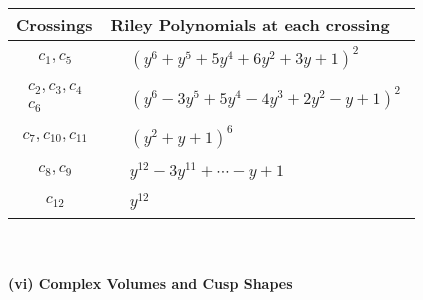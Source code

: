 \documentclass[1p]{elsarticle_modified}
\theoremstyle{definition}
\begin{document}
\begin{tabular}{m{50pt}|m{274pt}}
Crossings & \hspace{64pt}Riley Polynomials at each crossing \\
\hline $$\begin{aligned}c_{1},c_{5}\end{aligned}$$&$\begin{aligned}
&(y^6+y^5+5 y^4+6 y^2+3 y+1)^2
\end{aligned}$\\
\hline $$\begin{aligned}c_{2},c_{3},c_{4}\\c_{6}\end{aligned}$$&$\begin{aligned}
&(y^6-3 y^5+5 y^4-4 y^3+2 y^2- y+1)^2
\end{aligned}$\\
\hline $$\begin{aligned}c_{7},c_{10},c_{11}\end{aligned}$$&$\begin{aligned}
&(y^2+y+1)^6
\end{aligned}$\\
\hline $$\begin{aligned}c_{8},c_{9}\end{aligned}$$&$\begin{aligned}
&y^{12}-3 y^{11}+\cdots- y+1
\end{aligned}$\\
\hline $$\begin{aligned}c_{12}\end{aligned}$$&$\begin{aligned}
&y^{12}
\end{aligned}$\\
\hline
\end{tabular}\\~\\
\newpage\flushleft \textbf{(vi) Complex Volumes and Cusp Shapes}
\end{document}
